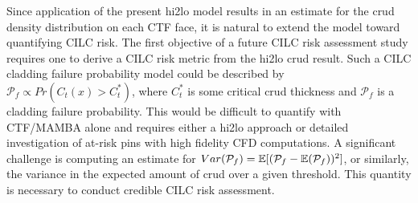 Since application of the present hi2lo model results in an estimate for the crud density distribution on each CTF face, it is natural to extend the model toward quantifying CILC risk.  The first objective of a future CILC risk assessment study requires one to derive a CILC risk metric from the hi2lo crud result.  Such a CILC cladding failure probability model could be described by $\mathcal P_f \propto Pr(C_t(x) > C_t^*)$, where $C_t^*$ is some critical crud thickness and $\mathcal P_f$ is a cladding failure probability.  This would be difficult to quantify with CTF/MAMBA alone and requires either a hi2lo approach or detailed investigation of at-risk pins with high fidelity CFD computations.  A significant challenge is computing an estimate for $Var(\mathcal P_f) = \operatorname*{\mathbb{E}}[(\mathcal P_f - \operatorname*{\mathbb{E}}(\mathcal P_f))^2]$, or similarly, the variance in the expected amount of crud over a given threshold.  This quantity is necessary to conduct credible CILC risk assessment.





